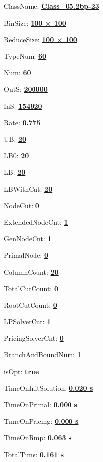 \documentclass[11pt]{article}
\begin{document}
\pagestyle{empty}


ClassName: \underline{\textbf{Class_05.2bp-23}}
\par
BinSize: \underline{\textbf{100 × 100}}
\par
ReduceSize: \underline{\textbf{100 × 100}}
\par
TypeNum: \underline{\textbf{60}}
\par
Num: \underline{\textbf{60}}
\par
OutS: \underline{\textbf{200000}}
\par
InS: \underline{\textbf{154920}}
\par
Rate: \underline{\textbf{0.775}}
\par
UB: \underline{\textbf{20}}
\par
LB0: \underline{\textbf{20}}
\par
LB: \underline{\textbf{20}}
\par
LBWithCut: \underline{\textbf{20}}
\par
NodeCut: \underline{\textbf{0}}
\par
ExtendedNodeCnt: \underline{\textbf{1}}
\par
GenNodeCnt: \underline{\textbf{1}}
\par
PrimalNode: \underline{\textbf{0}}
\par
ColumnCount: \underline{\textbf{20}}
\par
TotalCutCount: \underline{\textbf{0}}
\par
RootCutCount: \underline{\textbf{0}}
\par
LPSolverCnt: \underline{\textbf{1}}
\par
PricingSolverCnt: \underline{\textbf{0}}
\par
BranchAndBoundNum: \underline{\textbf{1}}
\par
isOpt: \underline{\textbf{true}}
\par
TimeOnInitSolution: \underline{\textbf{0.020 s}}
\par
TimeOnPrimal: \underline{\textbf{0.000 s}}
\par
TimeOnPricing: \underline{\textbf{0.000 s}}
\par
TimeOnRmp: \underline{\textbf{0.063 s}}
\par
TotalTime: \underline{\textbf{0.161 s}}
\par
\newpage


\end{document}
